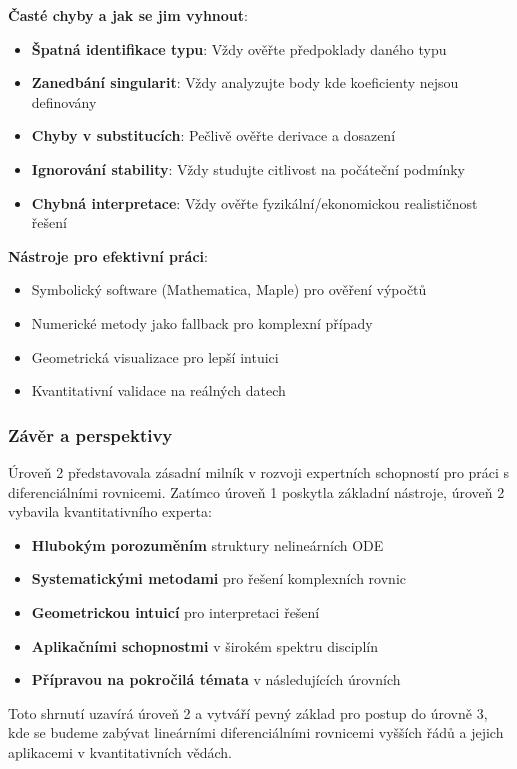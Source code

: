 \vspace{1\baselineskip}

\noindent\textbf{Časté chyby a jak se jim vyhnout}:
\begin{itemize}
\item \textbf{Špatná identifikace typu}: Vždy ověřte předpoklady daného typu
\item \textbf{Zanedbání singularit}: Vždy analyzujte body kde koeficienty nejsou definovány
\item \textbf{Chyby v substitucích}: Pečlivě ověřte derivace a dosazení
\item \textbf{Ignorování stability}: Vždy studujte citlivost na počáteční podmínky
\item \textbf{Chybná interpretace}: Vždy ověřte fyzikální/ekonomickou realističnost řešení
\end{itemize}

\vspace{1\baselineskip}

\noindent\textbf{Nástroje pro efektivní práci}:
\begin{itemize}
\item Symbolický software (Mathematica, Maple) pro ověření výpočtů
\item Numerické metody jako fallback pro komplexní případy
\item Geometrická visualizace pro lepší intuici
\item Kvantitativní validace na reálných datech
\end{itemize}

\subsubsection{Závěr a perspektivy}
\label{subsec:zaver-uroven2}

Úroveň 2 představovala zásadní milník v rozvoji expertních schopností pro práci s diferenciálními rovnicemi. Zatímco úroveň 1 poskytla základní nástroje, úroveň 2 vybavila kvantitativního experta:

\begin{itemize}
\item \textbf{Hlubokým porozuměním} struktury nelineárních ODE
\item \textbf{Systematickými metodami} pro řešení komplexních rovnic
\item \textbf{Geometrickou intuicí} pro interpretaci řešení
\item \textbf{Aplikačními schopnostmi} v širokém spektru disciplín
\item \textbf{Přípravou na pokročilá témata} v následujících úrovních
\end{itemize}

\vspace{1\baselineskip}

Toto shrnutí uzavírá úroveň 2 a vytváří pevný základ pro postup do úrovně 3, kde se budeme zabývat lineárními diferenciálními rovnicemi vyšších řádů a jejich aplikacemi v kvantitativních vědách.

\vspace{1\baselineskip}


